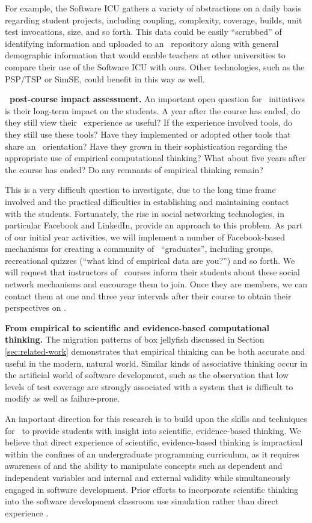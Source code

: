 For example, the Software ICU gathers a variety of abstractions on a daily
basis regarding student projects, including coupling, complexity, coverage,
builds, unit test invocations, size, and so forth.  This data could be
easily ``scrubbed'' of identifying information and uploaded to an \eCT\
repository along with general demographic information that would enable
teachers at other universities to compare their use of the Software ICU
with ours.  Other technologies, such as the PSP/TSP or SimSE, could benefit
in this way as well.

{\bf \eCT\ post-course impact assessment.}  An important open question for
\eCT\ initiatives is their long-term impact on the students.  A year after
the course has ended, do they still view their \eCT\ experience as useful?
If the experience involved tools, do they still use these tools?  Have they
implemented or adopted other tools that share an \eCT\ orientation?  Have
they grown in their sophistication regarding the appropriate use of
empirical computational thinking? What about five years after the course
has ended?  Do any remnants of empirical thinking remain?

This is a very difficult question to investigate, due to the long time
frame involved and the practical difficulties in establishing and
maintaining contact with the students.  Fortunately, the rise in social
networking technologies, in particular Facebook and LinkedIn, provide an approach to
this problem.  As part of our initial year activities, we will implement a
number of Facebook-based mechanisms for creating a community of \eCT\
``graduates'', including groups, recreational quizzes (``what kind of
empirical data are you?'') and so forth.  We will request that instructors
of \eCT\ courses inform their students about these social network
mechanisms and encourage them to join.  Once they are members, we can
contact them at one and three year intervals after their course to obtain
their perspectives on \eCT.

{\bf From empirical to scientific and evidence-based computational
thinking.}  The migration patterns of box jellyfish discussed in Section
\ref{sec:related-work} demonstrates that empirical thinking can be both
accurate and useful in the modern, natural world. Similar kinds of
associative thinking occur in the artificial world of software development,
such as the observation that low levels of test coverage are strongly
associated with a system that is difficult to modify as well as
failure-prone.

An important direction for this research is to build upon the skills and
techniques for \eCT\ to provide students with insight into scientific,
evidence-based thinking.  We believe that direct experience of
scientific, evidence-based thinking is impractical within the confines of
an undergraduate programming curriculum, as it requires awareness of and
the ability to manipulate concepts such as dependent and independent
variables and internal and external validity while simultaneously engaged
in software development. Prior efforts to incorporate scientific thinking into
the software development classroom use simulation rather than direct experience \citep{Host02}.

